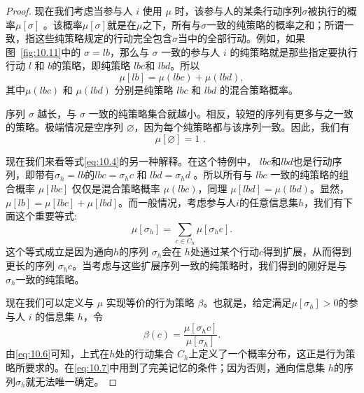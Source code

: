 \begin{proof}
现在我们考虑当参与人 \(i\) 使用 \(\mu\) 时，该参与人的某条行动序列\(\sigma\)被执行的概率\(\mu \left\lbrack  \sigma \right\rbrack\) 。该概率\(\mu[\sigma]\)就是在\(\mu\)之下，所有与\(\sigma\)一致的纯策略的概率之和；所谓一致，指这些纯策略规定的行动完全包含\(\sigma\)当中的全部行动。例如，如果图~\ref{fig:10.11}中的 \(\sigma  = {lb}\)，那么与 \(\sigma\) 一致的参与人 \(i\) 的纯策略就是那些指定要执行行动 \(l\) 和 \(b\)的策略，即纯策略 \({lbc}\)和 \({lbd}\)。所以 \begin{equation}
\label{eq:10.4}
\mu \left\lbrack  {lb}\right\rbrack   = \mu \left( {lbc}\right)  + \mu \left( {lbd}\right) ,
\end{equation}其中\(\mu \left( {lbc}\right)\) 和 \(\mu \left( {lbd}\right)\) 分别是纯策略 \({lbc}\) 和 \({lbd}\) 的混合策略概率。

序列 \(\sigma\) 越长，与 \(\sigma\) 一致的纯策略集合就越小。相反，较短的序列有更多与之一致的策略。极端情况是空序列 \(\varnothing\)，因为每个纯策略都与该序列一致。因此，我们有\begin{equation}
\label{eq:10.5}
\mu \left\lbrack  \varnothing \right\rbrack   = 1\text{ . }
\end{equation}

现在我们来看等式\eqref{eq:10.4}的另一种解释。在这个特例中， \({lbc}\)和\({lbd}\)也是行动序列，即带有\({\sigma }_{h} = {lb}\)的\({lbc} = {\sigma }_{h}c\) 和 \({lbd} = {\sigma }_{h}d\) 。所以所有与 \({lbc}\) 一致的纯策略的组合概率 \(\mu \left\lbrack  {lbc}\right\rbrack\) 仅仅是混合策略概率 \(\mu \left( {lbc}\right)\)，同理 \(\mu \left\lbrack  {lbd}\right\rbrack   = \mu \left( {lbd}\right)\)。显然，\(\mu \left\lbrack  {lb}\right\rbrack   = \mu \left\lbrack  {lbc}\right\rbrack   + \mu \left\lbrack  {lbd}\right\rbrack\)。而一般情况，考虑参与人\(i\)的任意信息集\(h\)，我们有下面这个重要等式:\begin{equation}
\label{eq:10.6}
\mu \left\lbrack  {\sigma }_{h}\right\rbrack   = \mathop{\sum }\limits_{{c \in  {C}_{h}}}\mu \left\lbrack  {{\sigma }_{h}c}\right\rbrack  .
\end{equation} 这个等式成立是因为通向\(h\)的序列 \({\sigma }_{h}\)会在 \(h\)处通过某个行动\(c\)得到扩展，从而得到更长的序列 \({\sigma }_{h}c\)。当考虑与这些扩展序列一致的纯策略时，我们得到的刚好是与 \({\sigma }_{h}\)一致的纯策略。

现在我们可以定义与 \(\mu\) 实现等价的行为策略 \(\beta\)。也就是，给定满足\(\mu \left\lbrack  {\sigma }_{h}\right\rbrack   > 0\)的参与人 \(i\) 的信息集 \(h\)，令\begin{equation}
\label{eq:10.7}
\beta \left( c\right)  = \frac{\mu \left\lbrack  {{\sigma }_{h}c}\right\rbrack  }{\mu \left\lbrack  {\sigma }_{h}\right\rbrack  }.
\end{equation} 由\eqref{eq:10.6}可知，上式在\(h\)处的行动集合 \({C}_{h}\)上定义了一个概率分布，这正是行为策略所要求的。在\eqref{eq:10.7}中用到了完美记忆的条件；因为否则，通向信息集 \(h\)的序列\({\sigma }_{h}\)就无法唯一确定。


\end{proof}
